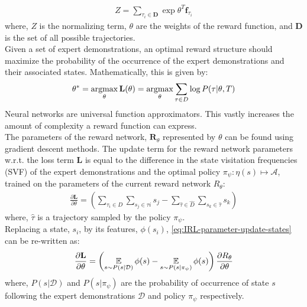\begin{align}
Z = \sum_{\tau_{i}\in \mathbf{D}}\exp{\theta^{T}\mathbf{f}_{\tau_{i}}}
\end{align}
where, $Z$ is the normalizing term, $\theta$ are the weights of the reward function, and $\mathbf{D}$ is the set of all possible trajectories.\\
Given a set of expert demonstrations, an optimal reward structure should maximize the probability of the occurrence of the expert demonstrations and their associated states. Mathematically, this is given by: 
\begin{align}
\label{eq:loglikelihood-IRL}
\theta^{*} = \operatorname*{argmax}_{\theta} \mathbf{L}(\theta) = \operatorname*{argmax}_{\theta} \sum_{\tau \in D} \log{P(\tau| \theta, T)}
\end{align}
 Neural networks are universal function approximators. This vastly increases the amount of complexity a reward function can express.\\
The parameters of the reward network, $\mathbf{R}_{\theta}$ represented by $\theta$ can be found using gradient descent methods. The  update term for the reward network parameters w.r.t. the loss term $\mathbf{L}$ is equal to the difference in the state visitation frequencies (SVF) of the expert demonstrations and the optimal policy $\pi_{\psi} : \eta(s) \mapsto \mathcal{A} $, trained on the parameters of the current reward network $R_{\theta}$:
\begin{align}
	\label{eq:IRL-parameter-update-states}
	\frac{\partial \mathbf{L}}{\partial \theta} = \left(\sum_{\tau_{i} \in D}\sum_{s_{j} \in \tau{i}}s_{j} - \sum_{\hat{\tau} \in \hat{D}}\sum_{s_{k} \in \hat{\tau}}s_{k}\right)
\end{align}
where, $\hat{\tau}$ is a trajectory sampled by the policy $\pi_{\psi}$.\\
Replacing a state, $s_{i}$, by its features, $\phi(s_{i})$, \autoref{eq:IRL-parameter-update-states} can be re-written as:
\begin{align}
	\label{eq:IRL-parameter-update-features}
	\frac{\partial \mathbf{L}}{\partial \theta} = \left(\operatorname*{\mathbb{E}}_{s \sim P(s|\mathcal{D})} \phi(s) - \operatorname*{\mathbb{E}}_{s \sim P(s|\pi_\psi)} \phi(s)\right) \frac{\partial R_\theta}{\partial \theta} 
\end{align}
where, $P(s|\mathcal{D})$ and $P(s|\pi_{\psi})$ are the probability of occurrence of state $s$ following the expert demonstrations $\mathcal{D}$ and policy $\pi_{\psi}$ respectively.
